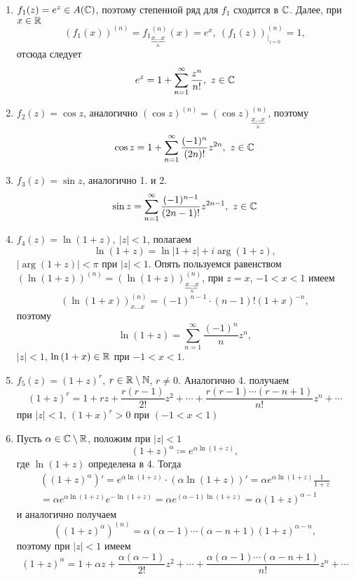 \documentclass[main]{subfiles}
\begin{document}
\begin{enumerate}
    \item $f_1(z) = e^z \in A(\mathbb{C})$, поэтому степенной ряд для $f_1$ сходится в $\mathbb{C}$.
          Далее, при $x\in\mathbb{R}$
          \[ (f_1(x))^{(n)} = {f_1}_{\underbrace{x \dotsc x}_n}^{(n)}(x) = e^x,\  (f_1(z))^{(n)}_{|_{z=0}}=1, \]
          отсюда следует
          \[ e^z = 1 + \sum_{n=1}^\infty \frac{z^n}{n!},\ z\in\mathbb{C} \]
    \item $f_2(z) = \cos{z}$, аналогично $(\cos{z})^{(n)} = (\cos{z})^{(n)}_{\underbrace{x \dotsc x}_n}$, поэтому
          \[ \cos{z} = 1 + \sum_{n=1}^\infty \frac{(-1)^n}{(2n)!} z^{2n},\ z \in \mathbb{C} \]
    \item $f_3(z) = \sin{z}$, аналогично 1. и 2.
          \[ \sin{z} = \sum_{n=1}^\infty \frac{(-1)^{n-1}}{(2n-1)!} z^{2n-1},\ z \in \mathbb{C} \]
    \item $f_4(z) = \ln{(1 + z)},\ |z|<1$, полагаем
          \[\ln{(1 + z)} = \ln{|1 + z|} + i \arg(1 + z),\]
          $|\arg(1 + z)| < \pi$ при $|z| < 1$.
          Опять пользуемся равенством $(\ln{(1 + z)})^{(n)}=(\ln{(1 + z)})^{(n)}_{\underbrace{x \dotsc x}_n}$, при $z=x$, $-1 < x < 1$ имеем
          \[(\ln{(1 + x)})^{(n)}_{x \dotsc x}=(-1)^{n-1}\cdot(n-1)!(1+x)^{-n},\]
          поэтому
          \[\ln{(1 + z)} = \sum_{n=1}^\infty \frac{(-1)^n}{n} z^n,\]
          $|z|<1$, $\ln{(1+x)}\in\mathbb{R}$ при $-1<x<1$.
    \item $f_5(z) = (1 + z)^r$, $r \in \mathbb{R} \setminus \mathbb{N}$, $r \neq 0$.
          Аналогично 4. получаем
          \[(1 + z)^r = 1 + rz + \frac{r(r - 1)}{2!} z^2 + \dotsb + \frac{r(r - 1) \dotsm (r - n + 1)}{n!} z^n + \dotsb \]
          при $|z| < 1$, $(1 + x)^r > 0$ при $(-1 < x < 1)$
    \item Пусть $\alpha \in \mathbb{C} \setminus \mathbb{R}$, положим при $|z| < 1$
          \[(1 + z)^\alpha \coloneq e^{\alpha \ln{(1 + z)}},\]
          где $\ln(1 + z)$ определена в 4.
          Тогда
          \begin{multline*}
              \left( (1 + z)^\alpha \right)' = e^{\alpha \ln{(1 + z)}}  \cdot (\alpha \ln{(1 + z)})' = \alpha e^{\alpha \ln{(1 + z)}} \frac{1}{1 + z}         \\
              = \alpha e^{\alpha \ln{(1 + z)}} e^{-\ln{(1 + z)}} = \alpha e^{(\alpha - 1) \ln{(1 + z)}} = \alpha (1 + z)^{\alpha - 1}
          \end{multline*}
          и аналогично получаем
          \[ \left( (1 + z)^\alpha \right)^{(n)} = \alpha (\alpha - 1) \dotsm (\alpha - n + 1) (1 + z)^{\alpha - n}, \]
          поэтому при $|z|<1$ имеем
          \[ (1 + z)^\alpha = 1 + \alpha z + \frac{\alpha(\alpha - 1)}{2!} z^2 + \dotsb + \frac{\alpha(\alpha - 1) \dotsm (\alpha - n + 1)}{n!} z^n+ \dotsb \]
\end{enumerate}
\end{document}
